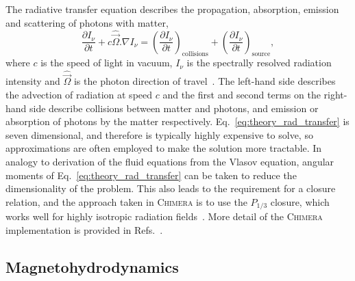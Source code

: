 The radiative transfer equation describes the propagation, absorption, emission and scattering of photons with matter,
\begin{equation}
    \label{eq:theory_rad_transfer}
    \frac{\partial I_\nu}{\partial t} + c \hat{\vec{\Omega}}.\nabla I_\nu = \left ( \frac{\partial I_\nu}{\partial t} \right )_{\text{collisions}} + \left ( \frac{\partial I_\nu}{\partial t} \right )_{\text{source}},
\end{equation}
where $c$ is the speed of light in vacuum, $I_\nu$ is the spectrally resolved radiation intensity and $\hat{\vec{\Omega}}$ is the photon direction of travel~\cite{castor_radiation_2004}.
The left-hand side describes the advection of radiation at speed $c$ and the first and second terms on the right-hand side describe collisions between matter and photons, and emission or absorption of photons by the matter respectively.
Eq.~\ref{eq:theory_rad_transfer} is seven dimensional, and therefore is typically highly expensive to solve, so approximations are often employed to make the solution more tractable.
In analogy to derivation of the fluid equations from the Vlasov equation, angular moments of Eq.~\ref{eq:theory_rad_transfer} can be taken to reduce the dimensionality of the problem.
This also leads to the requirement for a closure relation, and the approach taken in \textsc{Chimera} is to use the $P_{1/3}$ closure, which works well for highly isotropic radiation fields~\cite{morel_diffusionlimit_2000}.
More detail of the \textsc{Chimera} implementation is provided in Refs.~\cite{jennings_radiation_2005,mcglinchey_radiationhydrodynamics_2017}.

\subsection{Magnetohydrodynamics}%
\label{sec:theory_MHD}

